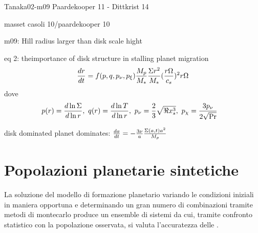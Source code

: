 \begin{workout}
Tanaka02-m09
Paardekooper 11 - Dittkrist 14
\end{workout}

\begin{workout}
masset casoli 10/paardekooper 10
\end{workout}

\begin{workout}
m09: Hill radius larger than disk scale hight
\end{workout}

\begin{workout}
eq 2: theimportance of disk structure in stalling planet migration
\begin{equation}
\TDy{t}{r}=f(p,q,p_{\nu},p_{\xi})\frac{M_p}{M_*}\frac{\Sigma r^2}{M_*}(\frac{r\Omega}{c_s})^2r\Omega
\end{equation}
dove
\begin{align}
&p(r)=\TDly{r}{\Sigma},\ q(r)=\TDly{r}{T},\ p_{\nu}=\frac{2}{3}\sqrt{\Re x_s^3},\ p_{\chi}=\frac{3p_{\nu}}{2\sqrt{\Pr}}
\end{align}
\end{workout}

\begin{workout}
disk dominated
planet dominates: $\TDy{t}{a}=-\frac{3\nu}{a}\frac{\Sigma(a,t)a^2}{M_p}$
\end{workout}

\section{Popolazioni planetarie sintetiche}
\begin{errata}
La soluzione del modello di formazione planetario variando le condizioni iniziali in maniera opportuna e determinando un gran numero di combinazioni tramite metodi di montecarlo produce un ensemble di sistemi da cui, tramite confronto statistico con la popolazione osservata, si valuta l'accuratezza delle .
\end{errata}


